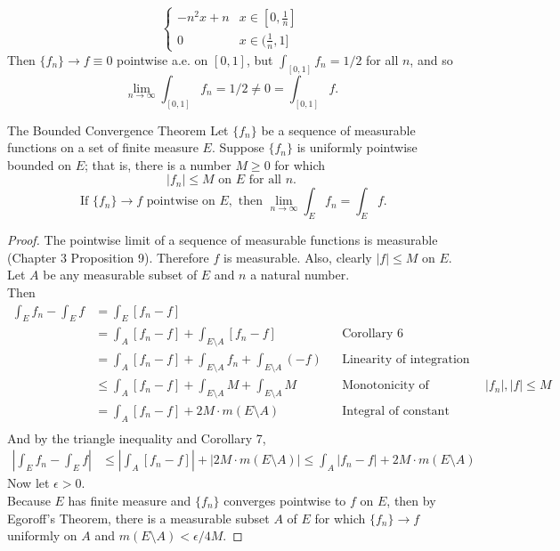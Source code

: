 \begin{flushleft}
\[\begin{cases}
                -n^2x+n&x\in[0,\frac{1}{n}]\\
                0&x\in(\frac{1}{n},1]
            \end{cases}
        \]
        Then $\{f_n\}\to f\equiv0$ pointwise a.e. on $[0,1]$, but $\int_{[0,1]}f_n=1/2$ for all $n$, and so
        \[
            \lim_{n\to\infty}\int_{[0,1]}f_n=1/2\neq0=\int_{[0,1]}f.
        \]
    \begin{namedthm*}{The Bounded Convergence Theorem}
        Let $\{f_n\}$ be a sequence of measurable functions on a set of finite measure $E$.
        Suppose $\{f_n\}$ is uniformly pointwise bounded on $E$; that is, there is a number $M\ge0$ for which
        \[
            |f_n|\le M\text{ on }E\text{ for all }n.
        \]
        \[
            \text{ If }\{f_n\}\to f\text{ pointwise on }E,\text{ then }\lim_{n\to\infty}\int_Ef_n=\int_Ef.   
        \]
    \end{namedthm*}
    \begin{proof}
        The pointwise limit of a sequence of measurable functions is measurable (Chapter 3 Proposition 9).
        Therefore $f$ is measurable.
        Also, clearly $|f|\le M$ on $E$.
        Let $A$ be any measurable subset of $E$ and $n$ a natural number.
        \\Then
        \begin{align*}
            \int_Ef_n-\int_Ef&=\int_E[f_n-f]\\
            &=\int_A[f_n-f]+\int_{E\setminus A}[f_n-f]&&\text{Corollary 6}\\
            &=\int_A[f_n-f]+\int_{E\setminus A}f_n+\int_{E\setminus A}(-f)&&\text{Linearity of integration}\\
            &\le\int_A[f_n-f]+\int_{E\setminus A}M+\int_{E\setminus A}M&&\text{Monotonicity of integration: }|f_n|,|f|\le M\\
            &=\int_A[f_n-f]+2M\cdot m(E\setminus A)&&\text{Integral of constant functions}\\
        \end{align*} 
        And by the triangle inequality and Corollary 7,
        \begin{align*}
            \left|\int_Ef_n-\int_Ef\right|
            &\le|\int_A[f_n-f]|+|2M\cdot m(E\setminus A)|
            \le\int_A|f_n-f|+2M\cdot m(E\setminus A)
        \end{align*}
        Now let $\epsilon>0$.
        \\Because $E$ has finite measure and $\{f_n\}$ converges pointwise to $f$ on $E$, then by Egoroff's Theorem, there is a measurable subset $A$ of $E$ for which $\{f_n\}\to f$ uniformly on $A$ and $m(E\setminus A)<\epsilon/4M$.

\end{proof}
\end{flushleft}
